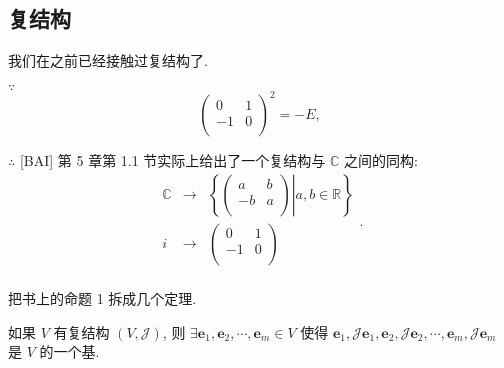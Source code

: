 \documentclass[color=black,device=normal,lang=cn,mode=geye]{elegantnote}
\begin{document}
\subsection{复结构}
我们在之前已经接触过复结构了.
\begin{example}
    $\because$
    \[\begin{pmatrix}
        0 & 1 \\
        -1 & 0 \\
    \end{pmatrix}^2=-E,\]

    $\therefore$ [BAI] 第 5 章第 1.1 节实际上给出了一个复结构与 $\mathbb{C}$ 之间的同构:
    \[\begin{array}{rcl}
        \mathbb{C} & \to & \left\{\left.\begin{pmatrix}
            a & b \\
            -b & a \\
        \end{pmatrix}\right|a,b\in\mathbb{R}\right\} \\
        i & \to & \begin{pmatrix}
            0 & 1 \\
            -1 & 0 \\
        \end{pmatrix} \\
    \end{array}.\]
\end{example}
把书上的命题 1 拆成几个定理.
\begin{theorem}\label{t4.1}
    如果 $V$ 有复结构 $(V,\mathcal{J})$, 则 $\exists\boldsymbol{e}_1,\boldsymbol{e}_2,\cdots,\boldsymbol{e}_m\in V$ 使得 $\boldsymbol{e}_1,\mathcal{J}\boldsymbol{e}_1,\boldsymbol{e}_2,\mathcal{J}\boldsymbol{e}_2,\cdots,\boldsymbol{e}_m,\mathcal{J}\boldsymbol{e}_m$ 是 $V$ 的一个基.
\end{theorem}
\end{document}
